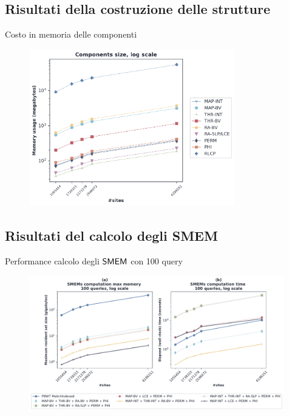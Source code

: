 \documentclass[]{beamer}
\def\SMEM{\mbox{\rm {\sf SMEM}}}
\begin{document}
\subsection{Risultati della costruzione delle strutture}
\begin{frame}{Costo in memoria delle componenti}
  \begin{figure}[H]
    \centering
    \includegraphics[width=0.8\textwidth]{img/comp_mem22.pdf}
  \end{figure}
\end{frame}
\subsection{Risultati del calcolo degli SMEM}
\begin{frame}{Performance calcolo degli $\SMEM$ con 100 query}
  \begin{figure}[H]
    \centering
    \includegraphics[width=0.99\textwidth]{img/exe_time_mem_paper2.pdf}
  \end{figure}
\end{frame}
\end{document}
